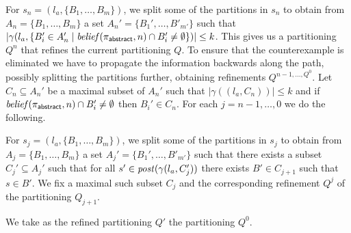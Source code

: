For $s_n  =(l_a,\{B_1,\ldots,B_m\})$, we split some of the partitions in $s_n$ to obtain from $A_n = \{B_1,\ldots,B_m\}$ a set $A_n' = \{B_1',\ldots, B'_{m'}\}$ such that $|\gamma(l_a,\{B_i' \in A_n' \mid \mathit{belief}(\pi_{\mathsf{abstract}}, n) \cap B_i' \neq \emptyset\})| \leq k$.
This gives us a partitioning $Q^n$ that refines the current partitioning $Q$. To ensure that the counterexample is eliminated we have to propagate the information backwards along the path, possibly splitting the partitions further, obtaining refinements $Q^{n-1,\ldots,Q^0}$.
Let $C_n \subseteq A_n'$ be a maximal subset of $A_n'$ such that $|\gamma((l_a,C_n))| \leq k$ and if $\mathit{belief}(\pi_{\mathsf{abstract}}, n) \cap B_i' \neq \emptyset$ then $B_i' \in C_n$.
For each $j = n-1,\ldots,0$ we do the following.

For $s_j  =(l_a,\{B_1,\ldots,B_m\})$, we split some of the partitions in $s_j$ to obtain from $A_j = \{B_1,\ldots,B_m\}$ a set $A_j' = \{B_1',\ldots, B'_{m'}\}$ such that there exists a subset $C_j'\subseteq A_j'$ such that for all $s' \in \mathit{post}(\gamma(l_a,C_j'))$ there exists $B' \in C_{j+1}$ such that $s \in B'$. We fix a maximal such subset $C_j$ and the corresponding refinement $Q^j$ of the partitioning $Q_{j+1}$. 

We take as the refined partitioning $Q'$ the partitioning $Q^0$.


